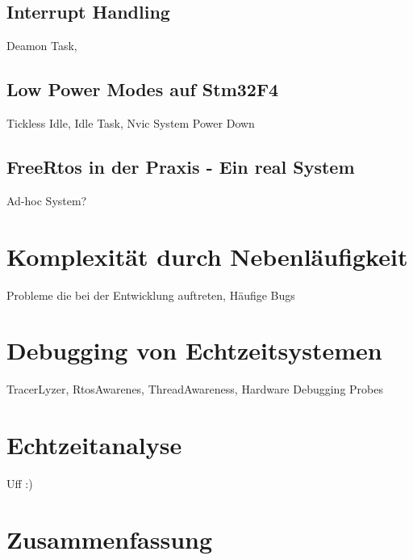 \documentclass[ngerman]{seminarvorlage}
\begin{document}
\subsection{Interrupt Handling}
Deamon Task,
\subsection{Low Power Modes auf Stm32F4}
Tickless Idle, Idle Task, Nvic System Power Down
\label{sec:Low Power Modes}
\subsection{FreeRtos in der Praxis - Ein real System}
Ad-hoc System? 
\section{Komplexität durch Nebenläufigkeit}
Probleme die bei der Entwicklung auftreten, Häufige Bugs
\section{Debugging von Echtzeitsystemen}
TracerLyzer, RtosAwarenes, ThreadAwareness, Hardware Debugging Probes 
\label{sec:Debugging von Echtzeitsystemen}
\section{Echtzeitanalyse}
Uff :)
\label{sec:Echtzeitanalyse} 

 
\section{Zusammenfassung}
\pagebreak

\end{document}
